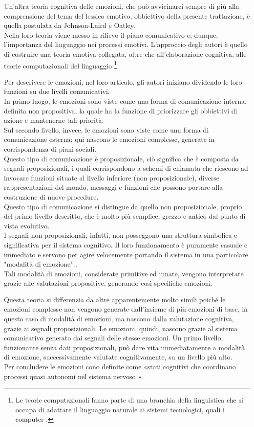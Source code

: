 Un'altra teoria cognitiva delle emozioni, che può avvicinarci sempre di più alla comprensione del tema del lessico emotivo, obbiettivo della presente trattazione, è quella postulata da Johnson-Laird e Oatley.\\
Nella loro teoria viene messo in rilievo il piano comunicativo e, dunque, l'importanza del linguaggio nei processi emotivi. L'approccio degli autori è quello di costruire una teoria emotiva collegata, oltre che all'elaborazione cognitiva, alle teorie computazionali del linguaggio \footnote{Le teorie computazionali fanno parte di una branchia della linguistica che si occupa di adattare il linguaggio naturale ai sistemi tecnologici, quali i computer \parencite{teorie_computazionali}.}.

Per descrivere le emozioni, nel loro articolo, gli autori iniziano dividendo le loro funzioni su due livelli comunicativi.\\
In primo luogo, le emozioni sono viste come una forma di comunicazione interna, definita non propositiva, la quale ha la funzione di priorizzare gli obbiettivi di azione e mantenerne tali priorità.\\
Sul secondo livello, invece, le emozioni sono viste come una forma di comunicazione esterna: qui nascono le emozioni complesse, generate in corrispondenza di piani sociali.\\
Questo tipo di comunicazione è proposizionale, ciò significa che è composta da segnali proposizionali, i quali corrispondono a schemi di chiamata che riescono ad invocare funzioni situate al livello inferiore (non proposizionale), diverse rappresentazioni del mondo, messaggi e funzioni che possono portare alla costruzione di nuove procedure.\\
Questo tipo di comunicazione si distingue da quello non proposizionale, proprio del primo livello descritto, che è molto più semplice, grezzo e antico dal punto di vista evolutivo.\\
I segnali non proposizionali, infatti, non posseggono una struttura simbolica e significativa per il sistema cognitivo. Il loro funzionamento è puramente casuale e immediato e servono per agire velocemente portando il sistema in una particolare "modalità di emozione" \parencite{Keith_JohnsonLaird}.\\
Tali modalità di emozioni, considerate primitive ed innate, vengono interpretate grazie alle valutazioni propositive, generando così specifiche emozioni. 

Questa teoria si differenzia da altre apparentemente molto simili poiché le emozioni complesse non vengono generate dall'insieme di più emozioni di base, in questo caso di modalità di emozioni, ma nascono dalla valutazione cognitiva, grazie ai segnali proposizionali.\clearpage
Le emozioni, quindi, nascono grazie al sistema comunicativo generato dai segnali delle stesse emozioni. Un primo livello, funzionante senza dati proposizionali, può dare vita immediatamente a modalità di emozione, successivamente valutate cognitivamente, su un livello più alto.\\
Per concludere le emozioni cono definite come «stati cognitivi che coordinano processi quasi autonomi nel sistema nervoso \parencite{Keith_JohnsonLaird}».

